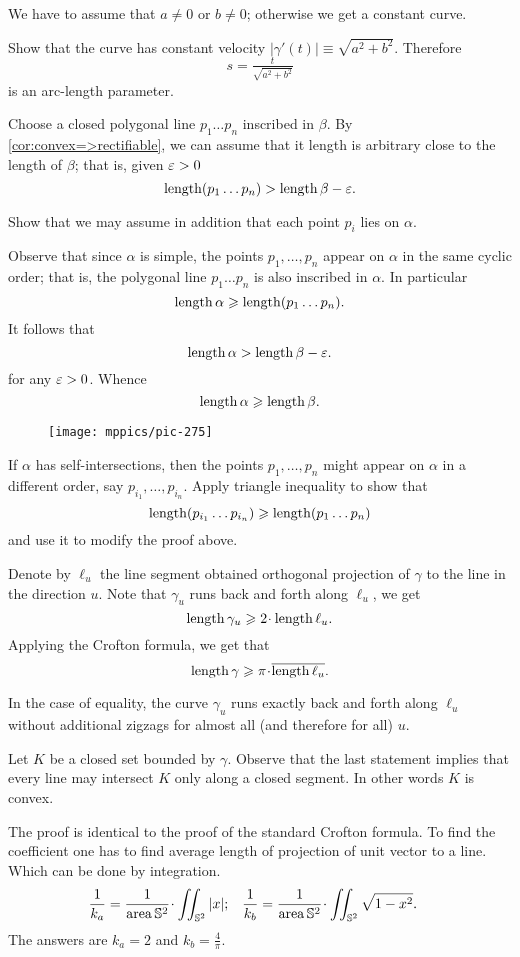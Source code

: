 We have to assume that $a\ne 0$ or $b\ne0$;
otherwise we get a constant curve.

Show that the curve has constant velocity $|\gamma'(t)|\equiv \sqrt{a^2+b^2}$.
Therefore 
\[s=\tfrac{t}{\sqrt{a^2+b^2}}\] is an arc-length parameter.


Choose a closed polygonal line $p_1\dots p_n$ inscribed in $\beta$.
By \ref{cor:convex=>rectifiable}, we can assume that it length is arbitrary close to the length of $\beta$;
that is, given $\varepsilon>0$ 
\[\mathop{\rm length}\nolimits (p_1\dots p_n)>\mathop{\rm length}\nolimits\beta-\varepsilon.\]

Show that we may assume in addition that each point $p_i$ lies on $\alpha$.

Observe that since $\alpha$ is simple, the points $p_1,\dots,p_n$ appear on $\alpha$ in the same cyclic order;
that is, the polygonal line $p_1\dots p_n$ is also inscribed in $\alpha$.
In particular 
\[\mathop{\rm length}\nolimits\alpha\geqslant \mathop{\rm length}\nolimits (p_1\dots p_n).\]
It follows that 
\[\mathop{\rm length}\nolimits\alpha>\mathop{\rm length}\nolimits\beta-\varepsilon.\]
for any $\varepsilon>0$.
Whence 
\[\mathop{\rm length}\nolimits\alpha\geqslant\mathop{\rm length}\nolimits\beta.\]

\begin{wrapfigure}{r}{25 mm}
\vskip-0mm
\centering
\texttt{[image: mppics/pic-275]}
\vskip0mm
\end{wrapfigure}

If $\alpha$ has self-intersections, then the points $p_1,\dots, p_n$ might appear on $\alpha$ in a different order, say $p_{i_1},\dots,p_{i_n}$.
Apply triangle inequality to show that 
\[\mathop{\rm length}\nolimits(p_{i_1}\dots p_{i_n})\geqslant \mathop{\rm length}\nolimits (p_1\dots p_n)\]
and use it to modify the proof above.

Denote by $\ell_u$ the line segment 
obtained orthogonal projection of $\gamma$ to the line in the direction $u$.
Note that $\gamma_u$ runs back and forth along $\ell_u$, we get 
\[\length\gamma_u\ge 2\cdot\length\ell_u.\]
Applying the Crofton formula, we get that 
\[\length\gamma\ge \pi\cdot \overline{\length\ell_u}.\]

In the case of equality, the curve $\gamma_u$ runs exactly back and forth along $\ell_u$ without additional zigzags for almost all (and therefore for all) $u$.

Let $K$ be a closed set bounded by $\gamma$.
Observe that the last statement implies that every line may intersect $K$ only along a closed segment.
In other words $K$ is convex.

The proof is identical to the proof of the standard Crofton formula.
To find the coefficient one has to find average length of projection of unit vector to a line.
Which can be done by integration.
\begin{align*}
\frac1{k_a}&=\frac{1}{\area \mathbb{S}^2}\cdot\iint_{\mathbb{S}^2} |x|;
&
\frac1{k_b}&=\frac{1}{\area \mathbb{S}^2}\cdot\iint_{\mathbb{S}^2} \sqrt{1-x^2}.
\end{align*}
The answers are $k_a=2$ and $k_b=\tfrac4\pi$.

